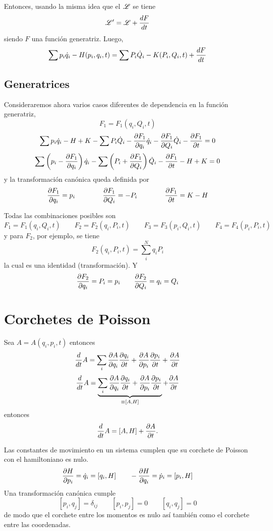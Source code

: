 \documentclass[10pt,oneside]{CBFT_book}
\begin{document}
Entonces, usando la misma idea que el $\Lag$ se tiene 
\[
	\Lag' = \Lag + \frac{dF}{dt}
\]
siendo $F$ una función generatriz. Luego,
\[
	\sum p_i \dot{q}_i - H(p_i,q_i,t) = \sum P_i\dot{Q}_i - K(P_i,Q_i,t) + \dtot{F}{t}
\]

\subsection{Generatrices}

Consideraremos ahora varios casos diferentes de dependencia en la función generatriz,
\[
	F_1 = F_1(q_i,Q_i,t)
\]
\[
	\sum p_i \dot{q}_i - H + K - \sum P_i \dot{Q}_i - \dpar{F_1}{q_i} \dot{q}_i - \dpar{F_1}{Q_i} \dot{Q}_i -
	\dpar{F_1}{t} = 0 
\]
\[
	\sum \left( p_i - \dpar{F_1}{q_i} \right) \dot{q}_i  - \sum \left( P_i + \dpar{F_1}{Q_i} \right) \dot{Q}_i -
	\dpar{F_1}{t} - H + K = 0 
\]
y la transformación canónica queda definida por 
\[
	\dpar{F_1}{q_i} = p_i \qquad \qquad \dpar{F_1}{Q_i} = - P_i \qquad \qquad \dpar{F_1}{t} = K-H
\]

Todas las combinaciones posibles son 
\[
	F_1 = F_1(q_i,Q_i,t) \qquad 
	F_2 = F_2(q_i,P_i,t) \qquad 
	F_3 = F_3(p_i,Q_i,t) \qquad 
	F_4 = F_4(p_i,P_i,t)
\]
y para $F_2$, por ejemplo, se tiene 
\[
	F_2(q_i,P_i,t) = \sum_i^N q_i P_i
\]
la cual es una identidad (transformación). Y
\[
	\dpar{F_2}{q_i} = P_i = p_i \qquad \dpar{F_2}{Q_i} = q_i = Q_i
\]

\section{Corchetes de Poisson}

Sea $A=A(q_i,p_i,t)$ entonces
\[
	\frac{d}{dt}A = \sum_i \dpar{A}{q_i} \dpar{q_i}{t} + \dpar{A}{p_i} \dpar{p_i}{t} + \dpar{A}{t}
\]
\[
	\frac{d}{dt}A = \underbrace{\sum_i \dpar{A}{q_i} \dpar{q_i}{t} + \dpar{A}{p_i} \dpar{p_i}{t}}_{\equiv [A,H]} + 
\dpar{A}{t}
\]
entonces
\[
	\frac{d}{dt}A = [A,H] + \dpar{A}{t}.
\]

Las constantes de movimiento en un sistema cumplen que su corchete de Poisson con el hamiltoniano es nulo.
\[
	\dpar{H}{p_i} = \dot{q}_i = [q_i,H] \qquad  -\dpar{H}{q_i} = \dot{p}_i = [p_i,H]
\]
Una transformación canónica cumple 
\[
	[p_i,q_j] = \delta_{ij} \qquad [p_i,p_j] = 0 \qquad [q_i,q_j] = 0
\]
de modo que el corchete entre los momentos es nulo así también como el corchete entre las coordenadas.









\end{document}
